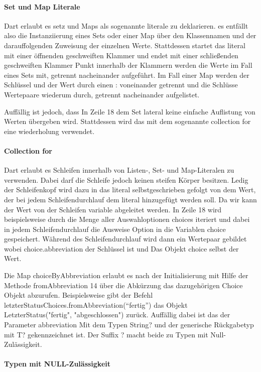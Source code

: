 \paragraph{Set und Map Literale}

Dart erlaubt es  setz und Maps als sogenannte literale zu deklarieren. es entfällt also die Instanziierung eines Sets oder einer Map über den Klassennamen und der darauffolgenden Zuweisung der einzelnen Werte. Stattdessen startet das literal mit einer öffnenden geschweiften Klammer und endet mit einer  schließenden geschweiften Klammer Punkt innerhalb der Klammern werden die Werte im Fall eines Sets  mit, getrennt nacheinander aufgeführt. Im Fall einer Map werden der Schlüssel und der Wert durch einen : voneinander getrennt und die Schlüsse Wertepaare wiederum durch, getrennt nacheinander aufgelistet.

Auffällig ist jedoch, dass In Zeile 18 dem Set lateral keine  einfache Auflistung von Werten übergeben wird. Stattdessen wird das mit dem sogenannte collection for eine wiederholung verwendet.

\paragraph{Collection for} Dart erlaubt es Schleifen innerhalb von Listen-, Set- und Map-Literalen zu verwenden. Dabei darf die Schleife jedoch keinen steifen Körper besitzen. Ledig der Schleifenkopf wird dazu in das literal selbstgeschrieben gefolgt von dem Wert, der bei jedem Schleifendurchlauf  dem literal hinzugefügt werden soll. Da wir kann der Wert von der Schleifen variable abgeleitet werden.  In Zeile 18 wird beispielsweise durch die  Menge aller Auswahloptionen choices iteriert und dabei in jedem Schleifendurchlauf  die Ausweise Option in die Variablen choice gespeichert. Während des Schleifendurchlauf wird dann ein Wertepaar gebildet wobei choice.abbreviation der Schlüssel ist und Das Objekt choice selbst  der Wert.

Die Map choiceByAbbreviation erlaubt es nach der Initialisierung mit Hilfe der Methode fromAbbreviation 14 über die Abkürzung das dazugehörigen Choice Objekt abzurufen. Beispielsweise gibt der Befehl letzterStatusChoices.fromAbbreviation(“fertig”) das Objekt LetzterStatus("fertig", "abgeschlossen")  zurück. Auffällig dabei ist das der Parameter abbreviation Mit dem Typen String? und der generische Rückgabetyp mit T? gekennzeichnet ist. Der Suffix ? macht beide zu Typen mit Null-Zulässigkeit.

\paragraph{Typen mit NULL-Zulässigkeit}

